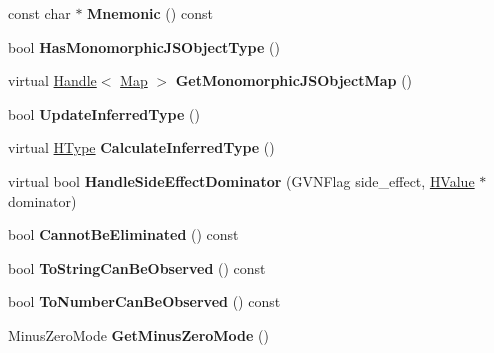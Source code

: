 \begin{DoxyCompactItemize}
\item 
const char $\ast$ {\bfseries Mnemonic} () const \hypertarget{classv8_1_1internal_1_1_h_value_a4169d73d5ed7bb3398b34616ca2ac437}{}\label{classv8_1_1internal_1_1_h_value_a4169d73d5ed7bb3398b34616ca2ac437}

\item 
bool {\bfseries Has\+Monomorphic\+J\+S\+Object\+Type} ()\hypertarget{classv8_1_1internal_1_1_h_value_a69bd24f443ace9130981ce8b4242858d}{}\label{classv8_1_1internal_1_1_h_value_a69bd24f443ace9130981ce8b4242858d}

\item 
virtual \hyperlink{classv8_1_1internal_1_1_handle}{Handle}$<$ \hyperlink{classv8_1_1internal_1_1_map}{Map} $>$ {\bfseries Get\+Monomorphic\+J\+S\+Object\+Map} ()\hypertarget{classv8_1_1internal_1_1_h_value_aa8abba867bf88874a71cfd1ed4850dfc}{}\label{classv8_1_1internal_1_1_h_value_aa8abba867bf88874a71cfd1ed4850dfc}

\item 
bool {\bfseries Update\+Inferred\+Type} ()\hypertarget{classv8_1_1internal_1_1_h_value_a951602769c915fe79f0fc178499a5253}{}\label{classv8_1_1internal_1_1_h_value_a951602769c915fe79f0fc178499a5253}

\item 
virtual \hyperlink{classv8_1_1internal_1_1_h_type}{H\+Type} {\bfseries Calculate\+Inferred\+Type} ()\hypertarget{classv8_1_1internal_1_1_h_value_a6b39baca39dad013ee37886610a0c607}{}\label{classv8_1_1internal_1_1_h_value_a6b39baca39dad013ee37886610a0c607}

\item 
virtual bool {\bfseries Handle\+Side\+Effect\+Dominator} (G\+V\+N\+Flag side\+\_\+effect, \hyperlink{classv8_1_1internal_1_1_h_value}{H\+Value} $\ast$dominator)\hypertarget{classv8_1_1internal_1_1_h_value_afb16f5c1d149525102c04ac3a000a134}{}\label{classv8_1_1internal_1_1_h_value_afb16f5c1d149525102c04ac3a000a134}

\item 
bool {\bfseries Cannot\+Be\+Eliminated} () const \hypertarget{classv8_1_1internal_1_1_h_value_a58c0f1cdea8c3265ba8c8b56733d15e6}{}\label{classv8_1_1internal_1_1_h_value_a58c0f1cdea8c3265ba8c8b56733d15e6}

\item 
bool {\bfseries To\+String\+Can\+Be\+Observed} () const \hypertarget{classv8_1_1internal_1_1_h_value_ad189dd3a2fbe2d9a7060fd1c1ad60383}{}\label{classv8_1_1internal_1_1_h_value_ad189dd3a2fbe2d9a7060fd1c1ad60383}

\item 
bool {\bfseries To\+Number\+Can\+Be\+Observed} () const \hypertarget{classv8_1_1internal_1_1_h_value_aa6c1b49667bd5017b60e4f27b17c6ab2}{}\label{classv8_1_1internal_1_1_h_value_aa6c1b49667bd5017b60e4f27b17c6ab2}

\item 
Minus\+Zero\+Mode {\bfseries Get\+Minus\+Zero\+Mode} ()\hypertarget{classv8_1_1internal_1_1_h_value_a14b7f5ed562f405f6727d8109426c5ab}{}\label{classv8_1_1internal_1_1_h_value_a14b7f5ed562f405f6727d8109426c5ab}

\end{DoxyCompactItemize}
